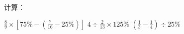计算：
\begin{subquestions}
\subquestion $\frac{8}{9} \times \left\lbrack 75\% - \left( \frac{7}{16} - 25\% \right) \right\rbrack$
\subquestion $4 \div \frac{2}{13} \times 125\%$
\subquestion $\left( \frac{1}{3} - \frac{1}{4} \right) \div 25\%$


\end{subquestions}